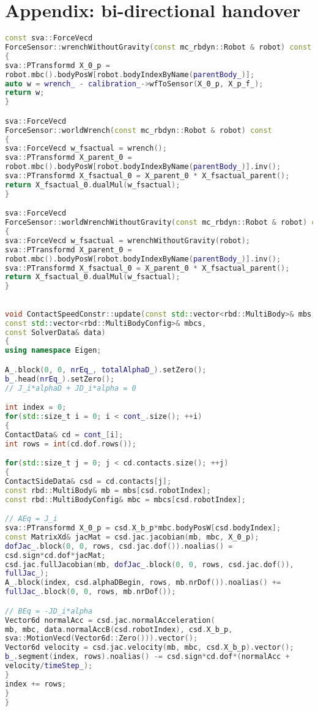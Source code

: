 \chapter{Appendix: bi-directional handover}

\begin{lstlisting}[language=C++,basicstyle=\footnotesize, caption={wrench}]
const sva::ForceVecd 
ForceSensor::wrenchWithoutGravity(const mc_rbdyn::Robot & robot) const
{
sva::PTransformd X_0_p = 
robot.mbc().bodyPosW[robot.bodyIndexByName(parentBody_)];
auto w = wrench_ - calibration_->wfToSensor(X_0_p, X_p_f_);
return w;
}

sva::ForceVecd 
ForceSensor::worldWrench(const mc_rbdyn::Robot & robot) const
{
sva::ForceVecd w_fsactual = wrench();
sva::PTransformd X_parent_0 = 
robot.mbc().bodyPosW[robot.bodyIndexByName(parentBody_)].inv();
sva::PTransformd X_fsactual_0 = X_parent_0 * X_fsactual_parent();
return X_fsactual_0.dualMul(w_fsactual);
}

sva::ForceVecd 
ForceSensor::worldWrenchWithoutGravity(const mc_rbdyn::Robot & robot) const
{
sva::ForceVecd w_fsactual = wrenchWithoutGravity(robot);
sva::PTransformd X_parent_0 = 
robot.mbc().bodyPosW[robot.bodyIndexByName(parentBody_)].inv();
sva::PTransformd X_fsactual_0 = X_parent_0 * X_fsactual_parent();
return X_fsactual_0.dualMul(w_fsactual);
}
\end{lstlisting}




\begin{lstlisting}[language=C++,basicstyle=\footnotesize, caption={QPContactConstr}]

void ContactSpeedConstr::update(const std::vector<rbd::MultiBody>& mbs,
const std::vector<rbd::MultiBodyConfig>& mbcs,
const SolverData& data)
{
using namespace Eigen;

A_.block(0, 0, nrEq_, totalAlphaD_).setZero();
b_.head(nrEq_).setZero();
// J_i*alphaD + JD_i*alpha = 0

int index = 0;
for(std::size_t i = 0; i < cont_.size(); ++i)
{
ContactData& cd = cont_[i];
int rows = int(cd.dof.rows());

for(std::size_t j = 0; j < cd.contacts.size(); ++j)
{
ContactSideData& csd = cd.contacts[j];
const rbd::MultiBody& mb = mbs[csd.robotIndex];
const rbd::MultiBodyConfig& mbc = mbcs[csd.robotIndex];

// AEq = J_i
sva::PTransformd X_0_p = csd.X_b_p*mbc.bodyPosW[csd.bodyIndex];
const MatrixXd& jacMat = csd.jac.jacobian(mb, mbc, X_0_p);
dofJac_.block(0, 0, rows, csd.jac.dof()).noalias() =
csd.sign*cd.dof*jacMat;
csd.jac.fullJacobian(mb, dofJac_.block(0, 0, rows, csd.jac.dof()),
fullJac_);
A_.block(index, csd.alphaDBegin, rows, mb.nrDof()).noalias() +=
fullJac_.block(0, 0, rows, mb.nrDof());

// BEq = -JD_i*alpha
Vector6d normalAcc = csd.jac.normalAcceleration(
mb, mbc, data.normalAccB(csd.robotIndex), csd.X_b_p,
sva::MotionVecd(Vector6d::Zero())).vector();
Vector6d velocity = csd.jac.velocity(mb, mbc, csd.X_b_p).vector();
b_.segment(index, rows).noalias() -= csd.sign*cd.dof*(normalAcc +
velocity/timeStep_);
}
index += rows;
}
}
\end{lstlisting}
